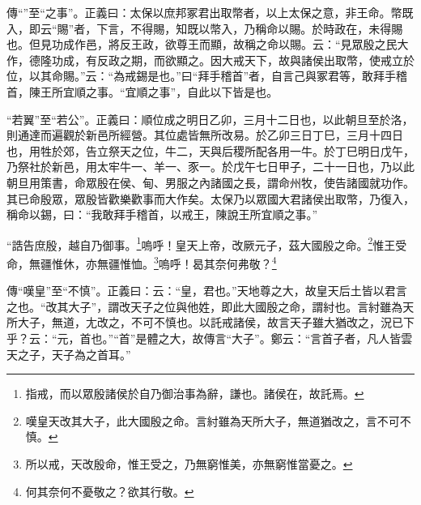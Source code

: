 {\noindent\zhuan{}\fzbyks 傳“”至“之事”。正義曰：太保以庶邦冢君出取幣者，以上太保之意，非王命。幣既入，即云“賜”者，下言，不得賜，知既以幣入，乃稱命以賜。於時政在，未得賜也。但見功成作邑，將反王政，欲尊王而顯，故稱之命以賜。云：“見眾殷之民大作，德隆功成，有反政之期，而欲顯之。因大戒天下，故與諸侯出取幣，使戒立於位，以其命賜。”云：“為戒錫是也。”曰“拜手稽首”者，自言己與冢君等，敢拜手稽首，陳王所宜順之事。“宜順之事”，自此以下皆是也。 \par}

{\noindent\shu{}\fzkt “若翼”至“若公”。正義曰：順位成之明日乙卯，三月十二日也，以此朝旦至於洛，則通達而遍觀於新邑所經營。其位處皆無所改易。於乙卯三日丁巳，三月十四日也，用牲於郊，告立祭天之位，牛二，天與后稷所配各用一牛。於丁巳明日戊午，乃祭社於新邑，用太牢牛一、羊一、豕一。於戊午七日甲子，二十一日也，乃以此朝旦用策書，命眾殷在侯、甸、男服之內諸國之長，謂命州牧，使告諸國就功作。其已命殷眾，眾殷皆歡樂歡事而大作矣。太保乃以眾國大君諸侯出取幣，乃復入，稱命以錫，曰：“我敢拜手稽首，以戒王，陳說王所宜順之事。” \par}

“誥告庶殷，越自乃御事。\footnote{指戒，而以眾殷諸侯於自乃御治事為辭，謙也。諸侯在，故託焉。}嗚呼！皇天上帝，改厥元子，茲大國殷之命。\footnote{嘆皇天改其大子，此大國殷之命。言紂雖為天所大子，無道猶改之，言不可不慎。}惟王受命，無疆惟休，亦無疆惟恤。\footnote{所以戒，天改殷命，惟王受之，乃無窮惟美，亦無窮惟當憂之。}嗚呼！曷其奈何弗敬？\footnote{何其奈何不憂敬之？欲其行敬。}


{\noindent\zhuan{}\fzbyks 傳“嘆皇”至“不慎”。正義曰：云：“皇，君也。”天地尊之大，故皇天后土皆以君言之也。“改其大子”，謂改天子之位與他姓，即此大國殷之命，謂紂也。言紂雖為天所大子，無道，尢改之，不可不慎也。以託戒諸侯，故言天子雖大猶改之，況已下乎？云：“元，首也。”“首”是體之大，故傳言“大子”。鄭云：“言首子者，凡人皆雲天之子，天子為之首耳。” \par}


